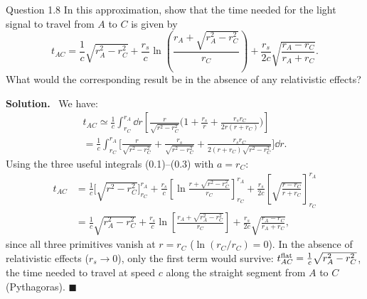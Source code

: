 \documentclass[11pt,a4paper]{article}
\numberwithin{equation}{subsection}
\newenvironment{solution}{\par\noindent\textbf{\textcolor{excol!70!black}{Solution.}}\ }{\hfill$\blacksquare$\par\medskip}
\begin{document}
\begin{problem}{Question 1.8}
In this approximation, show that the time needed for the light signal to travel from $A$ to $C$ is given by
\[
  t_{AC}=\frac1c\sqrt{r_A^2-r_C^2}+\frac{r_s}{c}\ln\left(\frac{r_A+\sqrt{r_A^2-r_C^2}}{r_C}\right)+\frac{r_s}{2c}\sqrt{\frac{r_A-r_C}{r_A+r_C}} . \tag{1.10}
\]
What would the corresponding result be in the absence of any relativistic effects?
\end{problem}
\begin{solution}
We have:
\begin{gather*}
  t_{AC}\simeq\frac1c\int_{r_C}^{r_A}\dd r\left[\frac{r}{\sqrt{r^2-r_C^2}}\Big(1+\frac{r_s}{r}+\frac{r_sr_C}{2r(r+r_C)}\Big)\right]\\
  =\frac1c\int_{r_C}^{r_A}\Big[\frac{r}{\sqrt{r^2-r_C^2}}+\frac{r_s}{\sqrt{r^2-r_C^2}}+\frac{r_sr_C}{2(r+r_C)\sqrt{r^2-r_C^2}}\Big]\dd r .
\end{gather*}
Using the three useful integrals (0.1)--(0.3) with $a=r_C$:
\begin{align*}
  t_{AC}&=\frac1c\Big[\sqrt{r^2-r_C^2}\Big]_{r_C}^{r_A}+\frac{r_s}{c}\left[\ln\frac{r+\sqrt{r^2-r_C^2}}{r_C}\right]_{r_C}^{r_A}+\frac{r_s}{2c}\left[\sqrt{\frac{r-r_C}{r+r_C}}\right]_{r_C}^{r_A}\\
  &=\frac1c\sqrt{r_A^2-r_C^2}+\frac{r_s}{c}\ln\left[\frac{r_A+\sqrt{r_A^2-r_C^2}}{r_C}\right]+\frac{r_s}{2c}\sqrt{\frac{r_A-r_C}{r_A+r_C}},
\end{align*}
since all three primitives vanish at $r=r_C$ ($\ln(r_C/r_C)=0$). In the absence of relativistic effects ($r_s\to0$), only the first term would survive: $t_{AC}^{\rm flat}=\frac1c\sqrt{r_A^2-r_C^2}$, the time needed to travel at speed $c$ along the straight segment from $A$ to $C$ (Pythagoras).
\end{solution}
\end{document}
